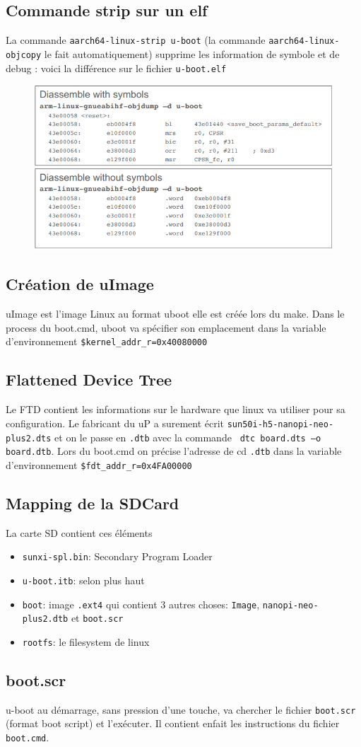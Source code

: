 \subsection{Commande strip sur un elf}
La commande \verb!aarch64-linux-strip u-boot! (la commande \verb!aarch64-linux-objcopy! le fait automatiquement) supprime les information de symbole et de debug : voici la différence sur le fichier \verb!u-boot.elf!
\begin{figure}[H]
\centering
\includegraphics[width=0.9\columnwidth]{Figures/uboot_01.png}
\end{figure}

\subsection{Création de uImage}
uImage est l'image Linux au format uboot elle est créée lors du make. Dans le process du boot.cmd, uboot va spécifier son emplacement dans la variable d'environnement \verb!$kernel_addr_r=0x40080000!

\subsection{Flattened Device Tree}
Le FTD contient les informations sur le hardware que linux va utiliser pour sa configuration. Le fabricant du uP a surement écrit \verb!sun50i-h5-nanopi-neo-plus2.dts! et on le passe en \verb!.dtb! avec la commande \verb! dtc board.dts –o board.dtb!. Lors du boot.cmd on précise l'adresse de cd \verb!.dtb! dans la variable d'environnement \verb!$fdt_addr_r=0x4FA00000!

\subsection{Mapping de la SDCard}
La carte SD contient ces éléments
\begin{itemize}
\item \verb!sunxi-spl.bin!: Secondary Program Loader
\item \verb!u-boot.itb!: selon plus haut
\item \verb!boot!: image \verb!.ext4! qui contient 3 autres choses: \verb!Image!, \verb!nanopi-neo-plus2.dtb! et \verb!boot.scr!
\item \verb!rootfs!: le filesystem de linux
\end{itemize}

\subsection{boot.scr}
u-boot au démarrage, sans pression d'une touche, va chercher le fichier \verb!boot.scr! (format boot script) et l'exécuter. Il contient enfait les instructions du fichier \verb!boot.cmd!.
